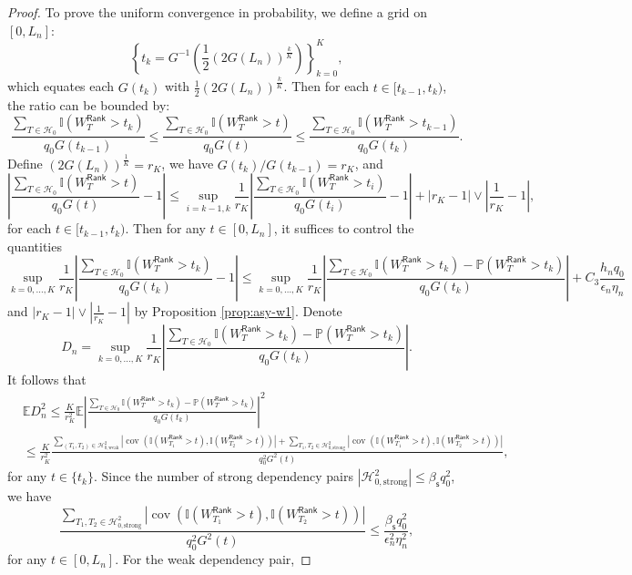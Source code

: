 \documentclass[12pt]{article}
\newcommand{\abs}[1]{\left\lvert#1\right\rvert}
\newcommand{\PP}{\mathbb{P}}
\newcommand{\E}{\mathbb{E}}
\newcommand{\cH}{\mathcal{H}}
\newcommand{\bbI}{\mathbb{I}}
\def\PP{{\mathbb P}}
\theoremstyle{plain}
\begin{document}
\begin{proof}
To prove the uniform convergence in probability, we define a grid on $[0,L_n]$:
$$\left\{ t_k= G^{-1}\left( \frac{1}{2} (2G(L_n))^{\frac{k}{K}} \right) \right\}_{k=0}^{K},  $$
which equates each $G(t_k)$ with $\frac{1}{2} (2G(L_n))^{\frac{k}{K}}$. Then for each $t\in [t_{k-1},t_{k})$, the ratio can be bounded by:
\begin{equation*}
    \frac{ \sum_{T\in\cH_0}\bbI(W_T^{\mathsf{Rank} }>t_{k} ) }{q_0 G(t_{k-1}) } \le \frac{ \sum_{T\in\cH_0}\bbI(W_T^{\mathsf{Rank} }>t ) }{q_0 G(t) } \le  \frac{ \sum_{T\in\cH_0}\bbI(W_T^{\mathsf{Rank} }>t_{k-1} ) }{q_0 G(t_{k}) }.
\end{equation*}
Define $(2G(L_n))^{\frac{1}{K}}=r_K$, we have $G(t_k)/G(t_{k-1})=r_K$, and 
\begin{equation*}
    \abs{\frac{ \sum_{T\in\cH_0}\bbI(W_T^{\mathsf{Rank} }>t ) }{q_0 G(t) } -1}\le \sup_{i=k-1,k}\frac{1}{r_K} \abs{\frac{ \sum_{T\in\cH_0}\bbI(W_T^{\mathsf{Rank} }>t_i ) }{q_0 G(t_{i}) }-1} +\abs{r_K-1}\vee\abs{\frac{1}{r_K}-1 },
\end{equation*}
for each $t\in [t_{k-1},t_{k})$. Then for any $t\in [0,L_n]$, it suffices to control the quantities 
\begin{equation*}
    \sup_{k=0,\dots, K}\frac{1}{r_K} \abs{\frac{ \sum_{T\in\cH_0}\bbI(W_T^{\mathsf{Rank} }>t_k ) }{q_0 G(t_{k}) }-1}\le  \sup_{k=0,\dots, K}\frac{1}{r_K} \abs{\frac{ \sum_{T\in\cH_0}\bbI(W_T^{\mathsf{Rank} }>t_k )-\PP(W_T^{\mathsf{Rank} }>t_k ) }{q_0 G(t_{k}) }} + C_3 \frac{h_n q_0}{\epsilon_n \eta_n }
\end{equation*}
and $\abs{r_K-1}\vee\abs{\frac{1}{r_K}-1 }$ by Proposition \ref{prop:asy-w1}.  Denote 
$$D_n=\sup\limits_{k=0,\dots, K}\frac{1}{r_K} \abs{\frac{ \sum_{T\in\cH_0}\bbI(W_T^{\mathsf{Rank} }>t_k )-\PP(W_T^{\mathsf{Rank} }>t_k ) }{q_0 G(t_{k}) }}.$$ 
It follows that
\begin{equation}
    \begin{aligned}
              &\E D_n^2\le \frac{K}{r_K^2}\E \abs{\frac{ \sum_{T\in\cH_0}\bbI(W_T^{\mathsf{Rank} }>t_{k} )-\PP(W_T^{\mathsf{Rank} }>t_{k} ) }{q_0 G(t_{k}) }}^2\\
              &\le  \frac{K}{r_K^2} \frac{\sum\limits_{(T_1,T_2)\in\cH^2_{0,\text{weak}}} \abs{\operatorname{cov}(\bbI(W_{T_1}^{\mathsf{Rank} }>t),\bbI(W_{T_2}^{\mathsf{Rank} }>t)) } +\sum\limits_{T_1,T_2\in\cH^2_{0,\text{strong}} } \abs{\operatorname{cov}(\bbI(W_{T_1}^{\mathsf{Rank} }>t),\bbI(W_{T_2}^{\mathsf{Rank} }>t)) } }{q_0^2 G^2(t) },
    \end{aligned}
\end{equation}
for any $t\in \{t_k\}$. Since the number of strong dependency pairs $\abs{\cH^2_{0,\text{strong}}}\le \beta_{\mathsf{s}}q_0^2 $, we have
\begin{equation*}
    \frac{\sum\limits_{T_1,T_2\in\cH^2_{0,\text{strong}} } \abs{\operatorname{cov}(\bbI(W_{T_1}^{\mathsf{Rank} }>t),\bbI(W_{T_2}^{\mathsf{Rank} }>t)) }}{q_0^2 G^2(t) }\le \frac{\beta_{\mathsf{s}}q_0^2 }{ \epsilon_n^2\eta_n^2},
\end{equation*}
for any $t\in [0,L_n]$. For the weak dependency pair, 


\end{proof}
\end{document}

